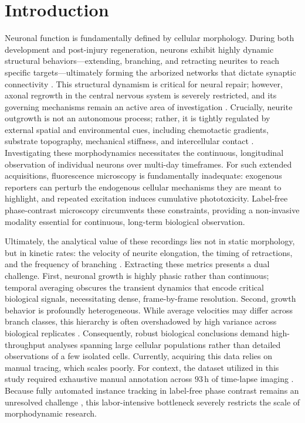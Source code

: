 \documentclass[11pt,a4paper]{article}
\begin{document}
\section{Introduction}
\label{sec:intro}

Neuronal function is fundamentally defined by cellular morphology. During
both development and post-injury regeneration, neurons exhibit highly
dynamic structural behaviors---extending, branching, and retracting neurites
to reach specific targets---ultimately forming the arborized networks that
dictate synaptic connectivity \cite{dotti1988polarity,lowery2009growthcone}.
This structural dynamism is critical for neural repair; however, axonal
regrowth in the central nervous system is severely restricted, and its
governing mechanisms remain an active area of investigation
\cite{sofroniew2018spinal,he2016axon}. Crucially, neurite outgrowth is not
an autonomous process; rather, it is tightly regulated by external spatial
and environmental cues, including chemotactic gradients, substrate
topography, mechanical stiffness, and intercellular contact
\cite{shefi2005twophase,baranes2012topographic,marcus2017interactions}.
Investigating these morphodynamics necessitates the continuous, longitudinal
observation of individual neurons over multi-day timeframes. For such
extended acquisitions, fluorescence microscopy is fundamentally inadequate:
exogenous reporters can perturb the endogenous cellular mechanisms they are
meant to highlight, and repeated excitation induces cumulative
phototoxicity. Label-free phase-contrast microscopy circumvents these
constraints, providing a non-invasive modality essential for continuous,
long-term biological observation.

Ultimately, the analytical value of these recordings lies not in static
morphology, but in kinetic rates: the velocity of neurite elongation, the
timing of retractions, and the frequency of branching
\cite{odde1996stochastic,ren2016growthcone,wissnergross2011largescale}.
Extracting these metrics presents a dual challenge. First, neuronal growth
is highly phasic rather than continuous; temporal averaging obscures the
transient dynamics that encode critical biological signals, necessitating
dense, frame-by-frame resolution. Second, growth behavior is profoundly
heterogeneous. While average velocities may differ across branch classes,
this hierarchy is often overshadowed by high variance across biological
replicates \cite{berkovich2025neurite}. Consequently, robust biological
conclusions demand high-throughput analyses spanning large cellular
populations rather than detailed observations of a few isolated cells.
Currently, acquiring this data relies on manual tracing, which scales
poorly. For context, the dataset utilized in this study required exhaustive
manual annotation across $93$\,h of time-lapse imaging
\cite{longair2011snt,meijering2004neuronj}. Because fully automated instance
tracking in label-free phase contrast remains an unresolved challenge
\cite{liu2022neurontracing}, this labor-intensive bottleneck severely
restricts the scale of morphodynamic research.
\end{document}
